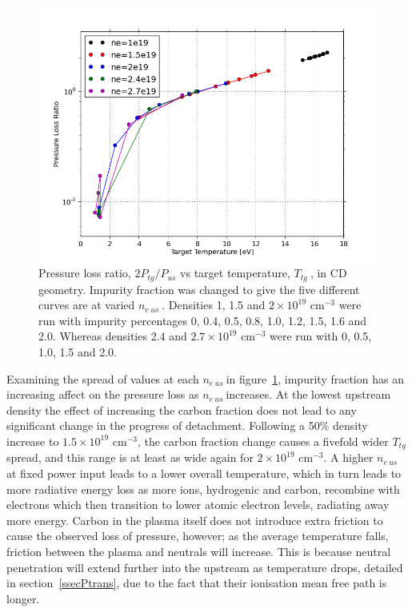 \documentclass[12pt]{article}  %
\providecommand{\noNe}[1]{{${#1}\times 10^{19}$ cm$^{-3}$}} %
\providecommand{\neus}{$n_{e~us}~$} %
\providecommand{\Ttg}{$T_{tg}~$} %
\begin{document}
\begin{figure}
\includegraphics[scale=0.5]{Figures/sol1d/CvarPL5nes.png}
\centering
\caption{Pressure loss ratio, $2P_{tg}/P_{us}$ vs target temperature, \Ttg, in CD geometry. Impurity fraction was changed to give the five different curves are at varied \neus. Densities 1, 1.5 and \noNe{2} were run with impurity percentages 0, 0.4, 0.5, 0.8, 1.0, 1.2, 1.5, 1.6 and 2.0. Whereas densities 2.4 and \noNe{2.7} were run with 0, 0.5, 1.0, 1.5 and 2.0.}\label{figCvarPL5nes}
\end{figure}

Examining the spread of values at each \neus in figure~\ref{figCvarPL5nes}, impurity fraction has an increasing affect on the pressure loss as \neus increases. At the lowest upstream density the effect of increasing the carbon fraction does not lead to any significant change in the progress of detachment. Following a 50\% density increase to \noNe{1.5}, the carbon fraction change causes a fivefold wider \Ttg spread, and this range is at least as wide again for \noNe{2}. A higher \neus at fixed power input leads to a lower overall temperature, which in turn leads to more radiative energy loss as more ions, hydrogenic and carbon, recombine with electrons which then transition to lower atomic electron levels, radiating away more energy. Carbon in the plasma itself does not introduce extra friction to cause the observed loss of pressure, however; as the average temperature falls, friction between the plasma and neutrals will increase. This is because neutral penetration will extend further into the upstream as temperature drops, detailed in section~\ref{ssecPtrans}, due to the fact that their ionisation mean free path is longer.
\end{document}
